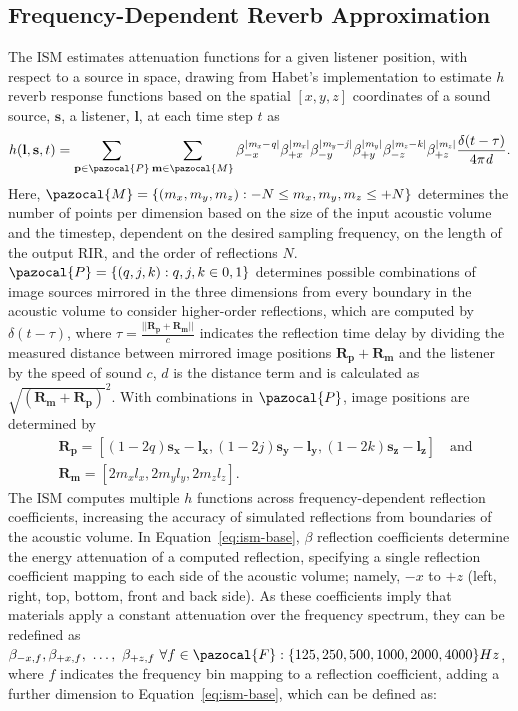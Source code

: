 \subsection{Frequency-Dependent Reverb Approximation}
The ISM estimates attenuation functions for a given listener position, with respect to a source in space, drawing from Habet's implementation \cite{habets2006room} to estimate $h$ reverb response functions based on the spatial $[x, y, z]$ coordinates of a sound source, $\mathbf{s}$, a listener, $\mathbf{l}$, at each time step $t$ as 
\begin{equation}
\label{eq:ism-base}
h(\mathbf{l}, \mathbf{s}, t) = \sum_{\mathbf{p} \in \pazocal{P}} \sum_{\mathbf{m} \in \pazocal{M}} \beta_{-x}^{|\mathit{m_x - q}|} \beta_{+x}^{|\mathit{m_x}|} \beta_{-y}^{|\mathit{m_y - j}|} \beta_{+y}^{|\mathit{m_y}|} \beta_{-z}^{|\mathit{m_z - k}|}  \beta_{+z}^{|\mathit{m_z}|} \frac{\delta(t - \tau)}{4\pi \mathit{d}}\textrm{.}
\end{equation}
Here, $\pazocal{M} = \{(m_x, m_y, m_z): -N \leq m_x, m_y, m_z \leq +N\}$ determines the number of points per dimension based on the size of the input acoustic volume and the timestep, dependent on the desired sampling frequency, on the length of the output RIR, and the order of reflections $N$. $\pazocal{P} = \{ (q, j, k): q, j, k \in {0, 1} \}$ determines possible combinations of image sources mirrored in the three dimensions from every boundary in the acoustic volume to consider higher-order reflections, which are computed by $\delta (t - \tau)$, where $\tau = \frac{||\mathbf{R_p} + \mathbf{R_m}||}{c}$ indicates the reflection time delay by dividing the measured distance between mirrored image positions $\mathbf{R_p} + \mathbf{R_m}$ and the listener by the speed of sound $c$, $d$ is the distance term and is calculated as $\sqrt{(\mathbf{R_m}+\mathbf{R_p})}^2$. With combinations in $\pazocal{P}$, image positions are determined by
\begin{align*}
&\mathbf{R_p} = [ (1 - 2q)\mathbf{s_x} - \mathbf{l_x}, (1 - 2j)\mathbf{s_y} - \mathbf{l_y}, (1 - 2k)\mathbf{s_z} - \mathbf{l_z} ] 
\quad \textrm{and} \\
&\mathbf{R_m} = [2 m_x l_x, 2 m_y l_y, 2 m_z l_z]\textrm{.}
\end{align*}
The ISM computes multiple $h$ functions across frequency-dependent reflection coefficients, increasing the accuracy of simulated reflections from boundaries of the acoustic volume. In Equation~\ref{eq:ism-base}, $\beta$ reflection coefficients determine the energy attenuation of a computed reflection, specifying a single reflection coefficient mapping to each side of the acoustic volume; namely, $-x$ to $+z$  (left, right, top, bottom, front and back side). As these coefficients imply that materials apply a constant attenuation over the frequency spectrum, they can be redefined as $\beta_{-x,f}, \beta_{+x,f},~\dots, ~\beta_{+z,f}~\forall f \in \pazocal{F}: \{125, 250, 500, 1000, 2000, 4000\} Hz$, where $f$ indicates the frequency bin mapping to a reflection coefficient, adding a further dimension to Equation~\ref{eq:ism-base}, which can be defined as:
